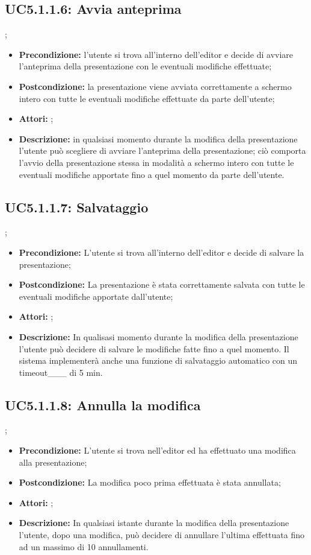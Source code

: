 \subsection{ UC5.1.1.6: Avvia anteprima}
;
\begin{itemize}
	\item \textbf{Precondizione:} l’utente si trova all’interno dell’editor e decide di avviare l’anteprima della presentazione con le eventuali modifiche effettuate;
	\item \textbf{Postcondizione:} la presentazione viene avviata correttamente a schermo intero con tutte le eventuali modifiche effettuate da parte dell’utente;
	\item \textbf{Attori:} ;
	\item \textbf{Descrizione:} in qualsiasi momento durante la modifica della presentazione l’utente può scegliere di avviare l’anteprima della presentazione; ciò comporta l’avvio della presentazione stessa in modalità a schermo intero con tutte le eventuali modifiche apportate fino a quel momento da parte dell’utente.
\end{itemize}
\subsection{ UC5.1.1.7: Salvataggio}
;
\begin{itemize}
	\item \textbf{Precondizione:} L’utente si trova all’interno dell’editor e decide di salvare la presentazione;
	\item \textbf{Postcondizione:} La presentazione è stata correttamente salvata con tutte le eventuali modifiche apportate dall’utente;
	\item \textbf{Attori:} ;
	\item \textbf{Descrizione:} In qualisasi momento durante la modifica della presentazione l’utente può decidere di salvare le modifiche fatte fino a quel momento. Il sistema implementerà anche una funzione di salvataggio automatico con un timeout___ di 5 min.
\end{itemize}
\subsection{ UC5.1.1.8: Annulla la modifica}
;
\begin{itemize}
	\item \textbf{Precondizione:} L’utente si trova nell’editor ed ha effettuato una modifica alla presentazione;
	\item \textbf{Postcondizione:} La modifica poco prima effettuata è stata annullata;
	\item \textbf{Attori:} ;
	\item \textbf{Descrizione:} In qualsiasi istante durante la modifica della presentazione l’utente, dopo una modifica, può decidere di annullare l’ultima effettuata fino ad un massimo di 10 annullamenti.
\end{itemize}
